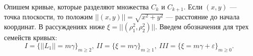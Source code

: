 Опишем кривые, которые разделяют множества $C_k$ и $C_{k+1}$. 
Если $(x,y)$ --- точка плоскости, то положим $||(x,y)|| = \sqrt{x^2+y^2}$ --- расстояние до начала координат. В рассуждениях ниже $\xi = ||(\rho_1^2, \rho_2^2)||$. Введем обозначения для трех семейств кривых:
\begin{equation}
I = \{ ||L_1|| = m \gamma \}_{m \geq 2}, \ II = \{ \xi = m \gamma\}_{m \geq 1}, \ III = \{ \xi = m \gamma + \varepsilon\}_{m \geq 0}.
\label{eq:families_def}
\end{equation}
%
%
%
%
%
%
%
%
%
